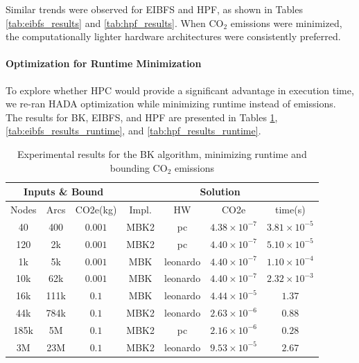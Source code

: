 \documentclass[a4paper,singleside,12pt]{report} %
\begin{document}
Similar trends were observed for EIBFS and HPF, as shown in Tables \ref{tab:eibfs_results} and \ref{tab:hpf_results}. When CO$_2$ emissions were minimized, the computationally
lighter hardware architectures were consistently preferred. 

\paragraph{Optimization for Runtime Minimization}

To explore whether HPC would provide a significant advantage in execution time, we re-ran HADA optimization while minimizing runtime instead of emissions. The results for BK, EIBFS, 
and HPF are presented in Tables \ref{tab:bk_results_time}, \ref{tab:eibfs_results_runtime}, and \ref{tab:hpf_results_runtime}.

\begin{table}[h!]
    \centering
    \begin{tabular}{|ccc|cccc|}
        \hline
        \multicolumn{3}{|c|}{Inputs \& Bound} & \multicolumn{4}{c|}{Solution} \\
        \hline
        Nodes & Arcs & CO2e(kg) & Impl. & HW & CO2e & time(s) \\
        \hline
        40 & 400 & $0.001$ & MBK2 & pc & $4.38 \times 10^{-7}$ & $3.81 \times 10^{-5}$ \\
        120 & 2k & $0.001$ & MBK2 & pc & $4.40 \times 10^{-7}$ & $5.10 \times 10^{-5}$ \\
        1k & 5k & $0.001$ & MBK & leonardo & $4.40 \times 10^{-7}$ & $1.10 \times 10^{-4}$ \\
        10k & 62k & $0.001$ & MBK & leonardo & $4.40 \times 10^{-7}$ & $2.32 \times 10^{-3}$ \\
        16k & 111k & $0.1$ & MBK & leonardo & $4.44 \times 10^{-5}$ & $1.37$ \\
        44k & 784k & $0.1$ & MBK2 & leonardo & $2.63 \times 10^{-6}$ & $0.88$ \\
        185k & 5M & $0.1$ & MBK2 & pc & $2.16 \times 10^{-6}$ & $0.28$ \\
        3M & 23M & $0.1$ & MBK2 & leonardo & $9.53 \times 10^{-5}$& $2.67$ \\
        \hline
    \end{tabular}
    \caption{Experimental results for the BK algorithm, minimizing runtime and bounding CO$_2$ emissions}
    \label{tab:bk_results_time}
\end{table}
\end{document}
